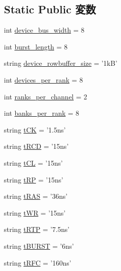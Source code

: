 \subsection*{Static Public 変数}
\begin{DoxyCompactItemize}
\item 
int \hyperlink{classDRAMCtrl_1_1DDR3__1333__x64__DRAMSim2_ac980afb64b962aec673eeadb21ea8b0e}{device\_\-bus\_\-width} = 8
\item 
int \hyperlink{classDRAMCtrl_1_1DDR3__1333__x64__DRAMSim2_afeba385888f1ce3063d25f20c0e7a89b}{burst\_\-length} = 8
\item 
string \hyperlink{classDRAMCtrl_1_1DDR3__1333__x64__DRAMSim2_ab24d9a52c5c94331e40478cc93e9abe1}{device\_\-rowbuffer\_\-size} = '1kB'
\item 
int \hyperlink{classDRAMCtrl_1_1DDR3__1333__x64__DRAMSim2_a60039c77757fd0118d81754311d71cfb}{devices\_\-per\_\-rank} = 8
\item 
int \hyperlink{classDRAMCtrl_1_1DDR3__1333__x64__DRAMSim2_ab610af52b1f27db17e9de304176a80a8}{ranks\_\-per\_\-channel} = 2
\item 
int \hyperlink{classDRAMCtrl_1_1DDR3__1333__x64__DRAMSim2_ac43360fda587200e99a090d69163e089}{banks\_\-per\_\-rank} = 8
\item 
string \hyperlink{classDRAMCtrl_1_1DDR3__1333__x64__DRAMSim2_a78016df5bd6c91551bcf487d3d665ebe}{tCK} = '1.5ns'
\item 
string \hyperlink{classDRAMCtrl_1_1DDR3__1333__x64__DRAMSim2_a31691ebf1f58ff89b00f261f5adea8e2}{tRCD} = '15ns'
\item 
string \hyperlink{classDRAMCtrl_1_1DDR3__1333__x64__DRAMSim2_a009c2614e5d317cb4805a4a98ace1b19}{tCL} = '15ns'
\item 
string \hyperlink{classDRAMCtrl_1_1DDR3__1333__x64__DRAMSim2_aeda425967c3cf2880bdc1640e9733439}{tRP} = '15ns'
\item 
string \hyperlink{classDRAMCtrl_1_1DDR3__1333__x64__DRAMSim2_a1b5f15dad9d492ce5d0167e1581de8cc}{tRAS} = '36ns'
\item 
string \hyperlink{classDRAMCtrl_1_1DDR3__1333__x64__DRAMSim2_a9d8360f5123eaf9b5b6013adca83d1ae}{tWR} = '15ns'
\item 
string \hyperlink{classDRAMCtrl_1_1DDR3__1333__x64__DRAMSim2_ac0793c2fe127d7331efb7012e82dae77}{tRTP} = '7.5ns'
\item 
string \hyperlink{classDRAMCtrl_1_1DDR3__1333__x64__DRAMSim2_af962cc8ff13de9c28027368562b67c1e}{tBURST} = '6ns'
\item 
string \hyperlink{classDRAMCtrl_1_1DDR3__1333__x64__DRAMSim2_a05307f048be759575436bb4a58206f04}{tRFC} = '160ns'

\end{DoxyCompactItemize}
